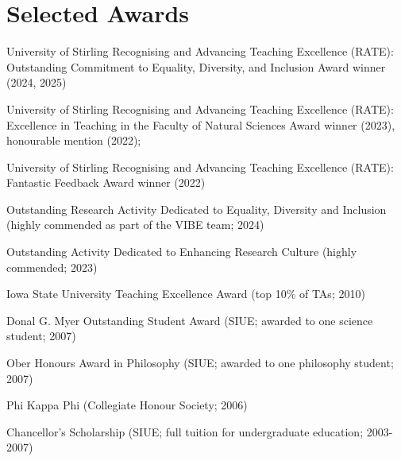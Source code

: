 \documentclass[letterpaper]{article}
\renewenvironment{itemize}{
  \begin{list}{}{
    \setlength{\leftmargin}{1.5em}
  }
}{
  \end{list}
}
\begin{document}
\section*{Selected Awards}
\begin{itemize}
\item University of Stirling Recognising and Advancing Teaching Excellence (RATE): Outstanding Commitment to Equality, Diversity, and Inclusion Award winner (2024, 2025)
\item University of Stirling Recognising and Advancing Teaching Excellence (RATE): Excellence in Teaching in the Faculty of Natural Sciences Award winner (2023), honourable mention (2022);
\item University of Stirling Recognising and Advancing Teaching Excellence (RATE): Fantastic Feedback Award winner (2022)
\item Outstanding Research Activity Dedicated to Equality, Diversity and Inclusion (highly commended as part of the VIBE team; 2024)
\item Outstanding Activity Dedicated to Enhancing Research Culture (highly commended; 2023)
\item Iowa State University Teaching Excellence Award (top 10\% of TAs; 2010)
\item Donal G. Myer Outstanding Student Award (SIUE; awarded to one science student; 2007)
\item Ober Honours Award in Philosophy (SIUE; awarded to one philosophy student; 2007)
\item Phi Kappa Phi (Collegiate Honour Society; 2006)
\item Chancellor's Scholarship (SIUE; full tuition for undergraduate education; 2003-2007)
\end{itemize}
\end{document}
